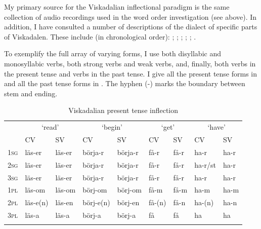 \documentclass[output=paper,colorlinks,citecolor=brown,draft,draftmode]{langscibook}
\begin{document}
My primary source for the Viskadalian inflectional paradigm is the same collection of audio recordings used in the word order investigation (see  above). In addition, I have consulted a number of descriptions of the dialect of specific parts of Viskadalen. These include (in chronological order): \citet{Moller1858}; \citet{Belfrage1871}; \citet{Andersson1922}; \citet{Kalen1923}; \citet{Lindberg1927}; \citet{GotlindLandtmanson1950}.



To exemplify the full array of varying forms, I use both disyllabic and monosyllabic verbs, both strong verbs and weak verbs, and, finally, both verbs in the present tense and verbs in the past tense. I give all the present tense forms in  and all the past tense forms in . The hyphen (-) marks the boundary between stem and ending.


\begin{table}
\footnotesize
\caption{\label{tab:petzell:2a} Viskadalian present tense inflection}
\begin{tabular}{lllllllll}
\lsptoprule
& \multicolumn{2}{c}{‘read’} & \multicolumn{2}{c}{‘begin’} & \multicolumn{2}{c}{‘get’} & \multicolumn{2}{c}{‘have’}\\\cmidrule(lr){2-3}\cmidrule(lr){4-5}\cmidrule(lr){6-7}\cmidrule(lr){8-9}
& CV & SV & CV & SV & CV & SV & CV & SV\\
\midrule
\textsc{1sg} & läs-er & läs-er & börja-r & börja-r & få-r & få-r & ha-r & ha-r\\
\textsc{2sg} & läs-er & läs-er & börja-r & börja-r & få-r & få-r & ha-r/st & ha-r\\
\textsc{3sg} & läs-er & läs-er & börja-r & börja-r & få-r & få-r & ha-r & ha-r\\
\textsc{1pl} & läs-om & läs-om & börj-om & börj-om & få-m & få-m & ha-m & ha-m\\
\textsc{2pl} & läs-e(n) & läs-en & börj-e(n) & börj-en & få-(n) & få-n & ha-(n) & ha-n\\
\textsc{3pl} & läs-a & läs-a & börj-a & börj-a & få & få & ha & ha\\
\lspbottomrule
\end{tabular}
\end{table}
\end{document}
